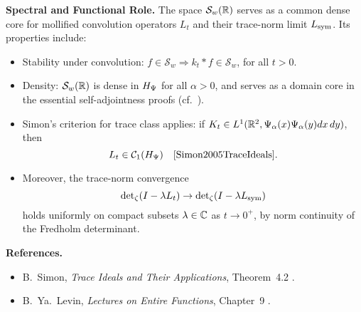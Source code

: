 \begin{definition}
\medskip
\noindent\textbf{Spectral and Functional Role.}
The space \( \mathcal{S}_w(\mathbb{R}) \) serves as a common dense core for mollified convolution operators \( L_t \) and their trace-norm limit \( L_{\mathrm{sym}} \). Its properties include:
\begin{itemize}
    \item Stability under convolution: \( f \in \mathcal{S}_w \Rightarrow k_t * f \in \mathcal{S}_w \), for all \( t > 0 \).
    \item Density: \( \mathcal{S}_w(\mathbb{R}) \) is dense in \( H_{\Psi} \) for all \( \alpha > 0 \), and serves as a domain core in the essential self-adjointness proofs (cf.~).
    \item Simon’s criterion for trace class applies: if \( K_t \in L^1(\mathbb{R}^2, \Psi_\alpha(x)\Psi_\alpha(y) dx\,dy) \), then
    \[
    L_t \in \mathcal{C}_1(\HPsi) \quad \text{\cite[Thm.~4.2]{Simon2005TraceIdeals}}.
    \]
    \item Moreover, the trace-norm convergence
    \[
    \det\nolimits_\zeta(I - \lambda L_t) \to \det\nolimits_\zeta(I - \lambda L_{\mathrm{sym}})
    \]
    holds uniformly on compact subsets \( \lambda \in \mathbb{C} \) as \( t \to 0^+ \), by norm continuity of the Fredholm determinant.
\end{itemize}

\medskip
\noindent\textbf{References.}
\begin{itemize}
    \item B.~Simon, \emph{Trace Ideals and Their Applications}, Theorem~4.2 \cite{Simon2005TraceIdeals}.
    \item B.~Ya.~Levin, \emph{Lectures on Entire Functions}, Chapter~9 \cite{Levin1996EntireLectures}.
\end{itemize}
\end{definition}
